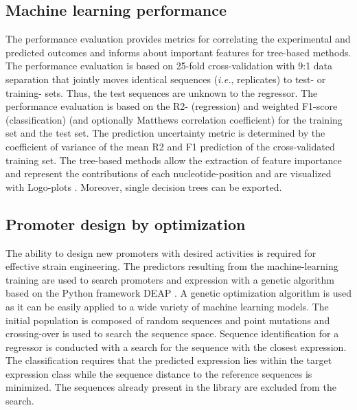 \documentclass[utf8]{frontiersSCNS} %
\begin{document}
\subsection{Machine learning performance}
The performance evaluation provides metrics for correlating the experimental and predicted outcomes and informs about important features for tree-based methods. The performance evaluation is based on 25-fold cross-validation with 9:1 data separation that jointly moves identical sequences (\textit{i.e.}, replicates) to test- or training- sets. Thus, the test sequences are unknown to the regressor. The performance evaluation is based on the R2- (regression) and weighted F1-score (classification) (and optionally Matthews correlation coefficient) for the training set and the test set. The prediction uncertainty metric is determined by the coefficient of variance of the mean R2 and F1 prediction of the cross-validated training set. The tree-based methods allow the extraction of feature importance and represent the contributions of each nucleotide-position and are visualized with Logo-plots \citep{Tareen2019}. Moreover, single decision trees can be exported.

\subsection{Promoter design by optimization}
The ability to design new promoters with desired activities is required for effective strain engineering. The predictors resulting from the machine-learning training are used to search promoters and expression with a genetic algorithm based on the Python framework DEAP \citep{Fortin2012}. A genetic optimization algorithm is used as it can be easily applied to a wide variety of machine learning models. The initial population is composed of random sequences and point mutations and crossing-over is used to search the sequence space.%
Sequence identification for a regressor is conducted with a search for the sequence with the closest expression. The classification requires that the predicted expression lies within the target expression class while the sequence distance to the reference sequences is minimized. The sequences already present in the library are excluded from the search. 
\end{document}
